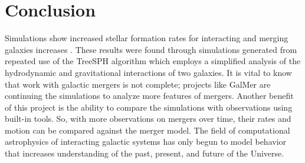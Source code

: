 \documentclass[11pt]{article} %
\begin{document}
\section{Conclusion}
	Simulations show increased stellar formation rates for interacting and merging galaxies increases \cite{mergers,mergerstats,LBG}. These results were found through simulations generated from repeated use of the TreeSPH algorithm which employs a simplified analysis of the hydrodynamic and gravitational interactions of two galaxies. It is vital to know that work with galactic mergers is not complete; projects like GalMer are continuing the simulations to analyze more features of mergers. Another benefit of this project is the ability to compare the simulations with observations using built-in tools. So, with more observations on mergers over time, their rates and motion can be compared against the merger model. The field of computational astrophysics of interacting galactic systems has only begun to model behavior that increases understanding of the past, present, and future of the Universe.




\end{document}

